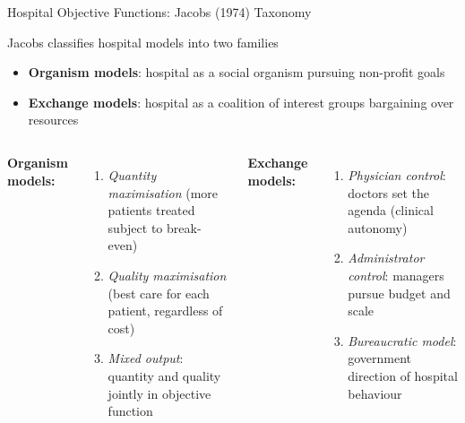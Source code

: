 \documentclass[aspectratio=169, 12pt]{beamer}
\begin{document}
\begin{frame}{Hospital Objective Functions: Jacobs (1974) Taxonomy}
  \begin{block}{Jacobs classifies hospital models into two families}
    \begin{itemize}
      \item \textbf{Organism models}: hospital as a social organism pursuing non-profit goals
      \item \textbf{Exchange models}: hospital as a coalition of interest groups bargaining over resources
    \end{itemize}
  \end{block}
  \vspace{0.3em}
  \begin{columns}
      \textbf{Organism models:}
      \begin{enumerate}
        \item \textit{Quantity maximisation} (more patients treated subject to break-even)
        \item \textit{Quality maximisation} (best care for each patient, regardless of cost)
        \item \textit{Mixed output}: quantity and quality jointly in objective function
      \end{enumerate}
      \textbf{Exchange models:}
      \begin{enumerate}
        \item \textit{Physician control}: doctors set the agenda (clinical autonomy)
        \item \textit{Administrator control}: managers pursue budget and scale
        \item \textit{Bureaucratic model}: government direction of hospital behaviour
      \end{enumerate}
  \end{columns}
\end{frame}
\end{document}
